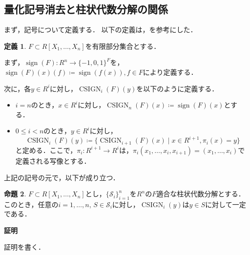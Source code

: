 \documentclass[uplatex, dvipdfmx]{jsarticle}
\makeatletter
\numberwithin{equation}{section}
\renewenvironment{proof}[1][\proofname]{\par
  \pushQED{\qed}%
  \normalfont \topsep6\p@\@plus6\p@\relax
  \trivlist
  \item\relax
  {\bfseries
  #1\@addpunct{.}}\hspace\labelsep\ignorespaces
}{
  \popQED\endtrivlist\@endpefalse
}
\newcommand{\calS}{\mathcal{S}}
\newcommand{\map}[3]{{#1}\colon{#2}\rightarrow{#3}}
\DeclareMathOperator{\sign}{sign}
\DeclareMathOperator{\CSIGN}{CSIGN}
\theoremstyle{definition}
\newtheorem{definition}{定義}[section]
\newtheorem{proposition}[definition]{命題}
\renewcommand{\proofname}{\textbf{証明}}
\makeatother
\begin{document}
\subsection{量化記号消去と柱状代数分解の関係}
まず，記号について定義する．
以下の定義は，\cite[Notation 11.7.]{MR2248869}を参考にした．
\begin{definition}
     $F \subset R[X_1, \dots, X_n]$を有限部分集合とする．

     まず，$\map{\sign(F)}{R^n}{\{-1, 0, 1\}^F}$を，
     $\sign(F)(x)(f)\coloneqq \sign(f(x)), f \in F$により定義する．

     次に，各$y \in R^i$に対し，$\CSIGN_i(F)(y)$を以下のように定義する．
     \begin{itemize}
          \item $i=n$のとき，$x \in R^i$に対し，$\CSIGN_n(F)(x)\coloneqq \sign(F)(x) $とする．
          \item $0 \leq i<n$のとき，$y \in R^i$に対し，
          \begin{equation}
               \CSIGN_i(F)(y) \coloneqq \{\CSIGN_{i+1}(F)(x) \mid x \in  R^{i+1}, \pi_i(x) = y\}
          \end{equation}
          と定める．ここで，$\map{\pi_i}{R^{i+1}}{R^i}$は，$\pi_i(x_1, \dots, x_i, x_{i+1}) = (x_1, \dots, x_i)$で定義される写像とする．
     \end{itemize}
\end{definition}

上記の記号の元で，以下が成り立つ．
\begin{proposition}
     $F \subset R[X_1, \dots, X_n]$とし，$\{\calS_i\}_{i=1}^n$を$R^n$の$F$適合な柱状代数分解とする．
     このとき，任意の$i=1, \dots, n$, $S \in \calS_i$に対し，$\CSIGN_i(y)$は$y \in S$に対して一定である．
\end{proposition}

\begin{proof}
     証明を書く．
\end{proof}

\end{document}
